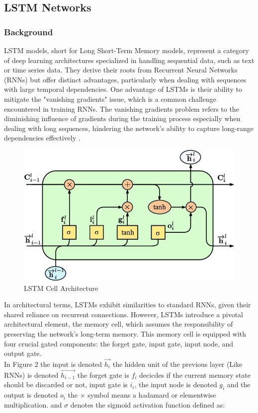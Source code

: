 \documentclass{article}
\begin{document}
\subsection{LSTM Networks}
\subsubsection{Background}

LSTM models, short for Long Short-Term Memory models, represent a category of deep learning architectures specialized in handling sequential data, such as text or time series data. They derive their roots from Recurrent Neural Networks (RNNs) but offer distinct advantages, particularly when dealing with sequences with large temporal dependencies. One advantage of LSTMs is their ability to mitigate the "vanishing gradients" issue, which is a common challenge encountered in training RNNs. The vanishing gradients problem refers to the diminishing influence of gradients during the training process especially when dealing with long sequences, hindering the network's ability to capture long-range dependencies effectively \cite{zhang2023}. \\

\begin{figure}
    \centering
    \includegraphics[width=0.5\linewidth]{LSTM.png}
    \caption{LSTM Cell Architecture}
    \label{fig:LSTM Diagram}
\end{figure}

In architectural terms, LSTMs exhibit similarities to standard RNNs, given their shared reliance on recurrent connections. However, LSTMs introduce a pivotal architectural element, the memory cell, which assumes the responsibility of preserving the network's long-term memory. This memory cell is equipped with four crucial gated components: the forget gate, input gate, input node, and output gate. \\

In Figure 2 the input is denoted $\Vec{h_i}$ the hidden unit of the previous layer (Like RNNs) is denoted $\vec{h_{i-1}}$ the forget gate is $f_i$ decicdes if the current memory state should be discarded or not, input gate is $i_i$, the input node is denoted $g_i$ and the output is denoted $o_i$ the $\times$ symbol means a hadamard or elementwise multiplication. and $\sigma$ denotes the sigmoid activation function defined as:\\
\end{document}
